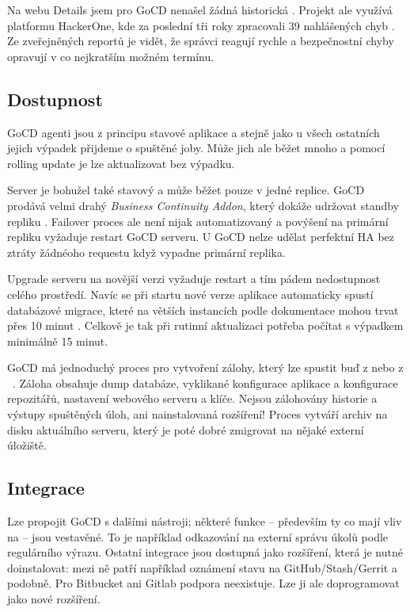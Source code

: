         Na webu  Details jsem pro GoCD nenašel žádná historická . Projekt ale využívá platformu HackerOne, kde za poslední tři roky zpracovali 39 nahlášených chyb \cite{gocd-hackerone}. Ze zveřejněných reportů je vidět, že správci reagují rychle a bezpečnostní chyby opravují v co nejkratším možném termínu.

    \subsection{Dostupnost}
        GoCD agenti jsou z principu stavové aplikace a stejně jako u všech ostatních \CI jejich výpadek přijdeme o spuštěné joby. Může jich ale běžet mnoho a pomocí rolling update je lze aktualizovat bez výpadku.

        Server je bohužel také stavový a může běžet pouze v jedné replice. GoCD prodává velmi drahý \textit{Business Continuity Addon}, který dokáže udržovat standby repliku \cite{gocd-ha}. Failover proces ale není nijak automatizovaný a povýšení na primární repliku vyžaduje restart GoCD serveru. U GoCD nelze udělat perfektní HA bez ztráty žádnéoho requestu když vypadne primární replika.

        Upgrade serveru na novější verzi vyžaduje restart a tím pádem nedostupnost celého prostředí. Navíc se při startu nové verze aplikace automaticky spustí databázové migrace, které na větších instancích podle dokumentace mohou trvat přes 10 minut \cite{gocd-upgrading}. Celkově je tak při rutinní aktualizaci potřeba počítat s výpadkem minimálně 15 minut.

        GoCD má jednoduchý proces pro vytvoření zálohy, který lze spustit buď z  nebo z ~\cite{gocd-backup}. Záloha obsahuje dump databáze, vyklikané  konfigurace aplikace a konfigurace repozitářů, nastavení webového serveru a klíče. Nejsou zálohovány historie a výstupy spuštěných úloh, ani nainstalovaná rozšíření! Proces vytváří archiv na disku aktuálního serveru, který je poté dobré zmigrovat na nějaké externí úložiště.

    \subsection{Integrace}
        Lze propojit GoCD s dalšími nástroji; některé funkce -- především ty co mají vliv na  -- jsou vestavěné. To je například odkazování na externí správu úkolů podle regulárního výrazu. Ostatní integrace jsou dostupná jako rozšíření, která je nutné doinstalovat: mezi ně patří například oznámení stavu na GitHub/Stash/Gerrit a podobně. Pro Bitbucket ani Gitlab podpora neexistuje. Lze ji ale doprogramovat jako nové rozšíření.

